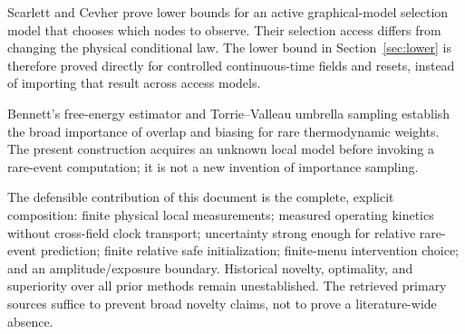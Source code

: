 \documentclass[11pt]{article}
\begin{document}
Scarlett and Cevher \cite{scarlett} prove lower bounds for an active graphical-model selection model that chooses which nodes to observe. Their selection access differs from changing the physical conditional law. The lower bound in Section~\ref{sec:lower} is therefore proved directly for controlled continuous-time fields and resets, instead of importing that result across access models.

Bennett's free-energy estimator \cite{bennett} and Torrie--Valleau umbrella sampling \cite{torrie} establish the broad importance of overlap and biasing for rare thermodynamic weights. The present construction acquires an unknown local model before invoking a rare-event computation; it is not a new invention of importance sampling.

The defensible contribution of this document is the complete, explicit composition: finite physical local measurements; measured operating kinetics without cross-field clock transport; uncertainty strong enough for relative rare-event prediction; finite relative safe initialization; finite-menu intervention choice; and an amplitude/exposure boundary. Historical novelty, optimality, and superiority over all prior methods remain unestablished. The retrieved primary sources suffice to prevent broad novelty claims, not to prove a literature-wide absence.
\end{document}
